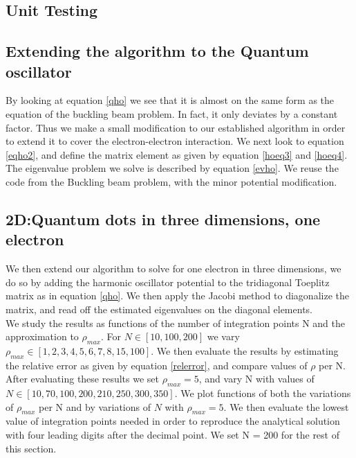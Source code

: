 \documentclass[%
reprint,
amsmath,amssymb,
aps,
]{revtex4-1}
\begin{document}
\subsection{Unit Testing}

\subsection{Extending the algorithm to the Quantum oscillator} \noindent 
By looking at equation \ref{qho} we see that it is almost on the same form as the equation of the buckling beam problem. In fact, it only deviates by a constant factor. Thus we make a small modification to our established algorithm in order to extend it to cover the electron-electron interaction. We next look to equation \ref{eqho2}, and define the matrix element as given by equation \ref{hoeq3} and \ref{hoeq4}. The eigenvalue problem we solve is described by equation \ref{evho}. We reuse the code from the Buckling beam problem, with the minor potential modification.

\subsection{2D:Quantum dots in three dimensions, one electron} \noindent 
We then extend our algorithm to solve for one electron in three dimensions, we do so by adding the harmonic oscillator potential to the tridiagonal Toeplitz matrix as in equation \ref{qho}. We then apply the Jacobi method to diagonalize the matrix, and read off the estimated eigenvalues on the diagonal elements. \\ \indent We study the results as functions of the number of integration points N and the approximation to $\rho_{max}$. For $N\in[10,100,200]$ we vary $\rho_{max} \in [1, 2, 3, 4, 5, 6, 7, 8, 15, 100]$. We then evaluate the results by estimating the relative error as given by equation \ref{relerror}, and compare values of $\rho$ per N. After evaluating these results we set $\rho_{max} = 5$, and vary N with values of $N\in[10, 70, 100, 200, 210, 250, 300, 350]$. We plot functions of both the variations of $\rho_{max}$ per N and by variations of $N$ with $\rho_{max} = 5$. We then evaluate the lowest value of integration points needed in order to reproduce the analytical solution with four leading digits after the decimal point. We set N = 200 for the rest of this section. 
\end{document}
